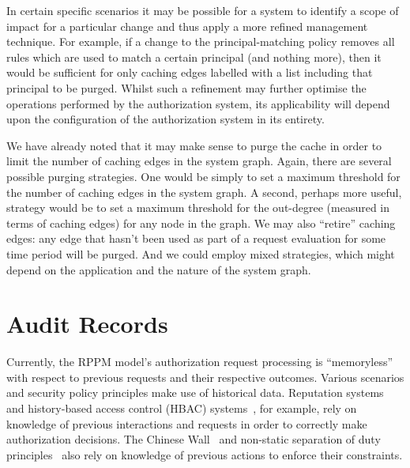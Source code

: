 \documentclass{article}
\begin{document}
In certain specific scenarios it may be possible for a system to identify a scope of impact for a particular change and thus apply a more refined management technique.
For example, if a change to the principal-matching policy removes all rules which are used to match a certain principal (and nothing more), then it would be sufficient for only caching edges labelled with a list including that principal to be purged.
Whilst such a refinement may further optimise the operations performed by the authorization system, its applicability will depend upon the configuration of the authorization system in its entirety.

We have already noted that it may make sense to purge the cache in order to limit the number of caching edges in the system graph.
Again, there are several possible purging strategies.
One would be simply to set a maximum threshold for the number of caching edges in the system graph.
A second, perhaps more useful, strategy would be to set a maximum threshold for the out-degree (measured in terms of caching edges) for any node in the graph.
We may also ``retire'' caching edges: any edge that hasn't been used as part of a request evaluation for some time period will be purged.
And we could employ mixed strategies, which might depend on the application and the nature of the system graph.

\section{Audit Records}\label{sec:audit}
Currently, the RPPM model's authorization request processing is ``memoryless'' with respect to previous requests and their respective outcomes.
Various scenarios and security policy principles make use of historical data.
Reputation systems and history-based access control (HBAC) systems~\cite{AbadiF03,EdjlaliAC99,KrukowNS08}, for example, rely on knowledge of previous interactions and requests in order to correctly make authorization decisions.
The Chinese Wall~\cite{BrewerN89} and non-static separation of duty principles~\cite{GligorGF98,SimonZ97} also rely on knowledge of previous actions to enforce their constraints.
\end{document}
